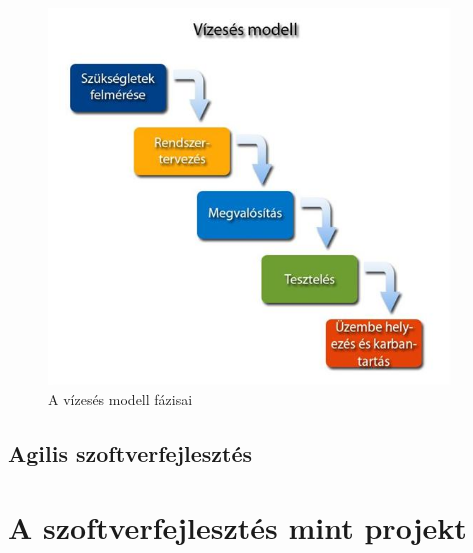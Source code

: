 \documentclass[a4paper,12pt,leqno, notitlepage]{article}%
\begin{document}
\begin{figure}[htb]
	\centering
		\includegraphics[width=0.95\textwidth]{images/waterfall.jpg}
	\caption{A vízesés modell fázisai \cite{waterfall_image}}
	\label{fig:waterfall}
\end{figure}


\cite{waterfall}


\subsection{Agilis szoftver\-fejlesztés}



\section{A szoftver\-fejlesztés mint projekt}


{}

\end{document}
